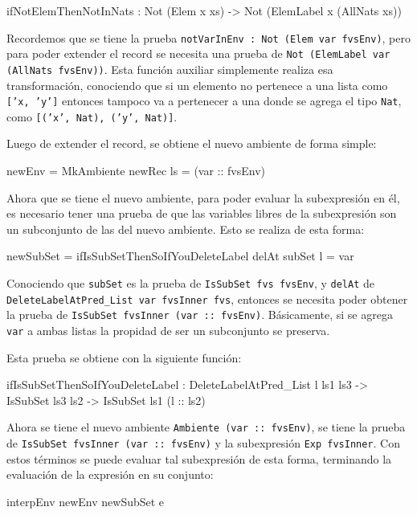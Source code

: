 \begin{code}
ifNotElemThenNotInNats : Not (Elem x xs) -> 
  Not (ElemLabel x (AllNats xs))
\end{code}

Recordemos que se tiene la prueba \texttt{notVarInEnv : Not (Elem var fvsEnv)}, pero para poder extender el record se necesita una prueba de \texttt{Not (ElemLabel var (AllNats fvsEnv))}. Esta función auxiliar simplemente realiza esa transformación, conociendo que si un elemento no pertenece a una lista como \texttt{['x, 'y']} entonces tampoco va a pertenecer a una donde se agrega el tipo \texttt{Nat}, como \texttt{[('x', Nat), ('y', Nat)]}.

Luego de extender el record, se obtiene el nuevo ambiente de forma simple:

\begin{code}
newEnv = MkAmbiente newRec {ls = (var :: fvsEnv)}
\end{code}

Ahora que se tiene el nuevo ambiente, para poder evaluar la subexpresión en él, es necesario tener una prueba de que las variables libres de la subexpresión son un subconjunto de las del nuevo ambiente. Esto se realiza de esta forma:

\begin{code}
newSubSet = 
  ifIsSubSetThenSoIfYouDeleteLabel delAt subSet {l = var}
\end{code}

Conociendo que \texttt{subSet} es la prueba de \texttt{IsSubSet fvs fvsEnv}, y \texttt{delAt} de \texttt{DeleteLabelAtPred\_List var fvsInner fvs}, entonces se necesita poder obtener la prueba de \texttt{IsSubSet fvsInner (var :: fvsEnv)}. Básicamente, si se agrega \texttt{var} a ambas listas la propidad de ser un subconjunto se preserva.

Esta prueba se obtiene con la siguiente función:

\begin{code}
ifIsSubSetThenSoIfYouDeleteLabel : 
  DeleteLabelAtPred_List l ls1 ls3 -> 
  IsSubSet ls3 ls2 -> IsSubSet ls1 (l :: ls2)
\end{code}

Ahora se tiene el nuevo ambiente \texttt{Ambiente (var :: fvsEnv)}, se tiene la prueba de \texttt{IsSubSet fvsInner (var :: fvsEnv)} y la subexpresión \texttt{Exp fvsInner}. Con estos términos se puede evaluar tal subexpresión de esta forma, terminando la evaluación de la expresión en su conjunto:

\begin{code}
interpEnv newEnv newSubSet e
\end{code}

